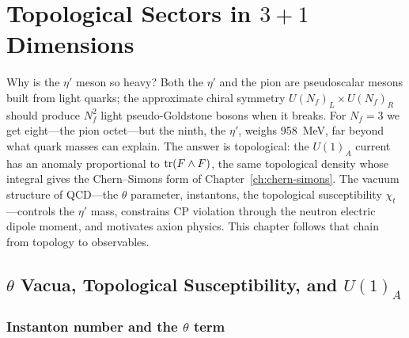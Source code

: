 %

\section{Topological Sectors in $3+1$ Dimensions}
\label{sec:sectors-3plus1d}

Why is the $\eta'$ meson so heavy?  Both the $\eta'$ and the pion are pseudoscalar mesons built from light quarks; the approximate chiral symmetry $U(N_f)_L \times U(N_f)_R$ should produce $N_f^2$ light pseudo-Goldstone bosons when it breaks.  For $N_f = 3$ we get eight---the pion octet---but the ninth, the $\eta'$, weighs 958~MeV, far beyond what quark masses can explain.  The answer is topological: the $U(1)_A$ current has an anomaly proportional to $\operatorname{tr}(F\wedge F)$, the same topological density whose integral gives the Chern--Simons form of Chapter~\ref{ch:chern-simons}.  The vacuum structure of QCD---the $\theta$ parameter, instantons, the topological susceptibility $\chi_t$---controls the $\eta'$ mass, constrains CP violation through the neutron electric dipole moment, and motivates axion physics.  This chapter follows that chain from topology to observables.

\subsection{$\theta$ Vacua, Topological Susceptibility, and $U(1)_A$}
\label{subsec:theta-chi-u1a}

\subsubsection{Instanton number and the $\theta$ term}

